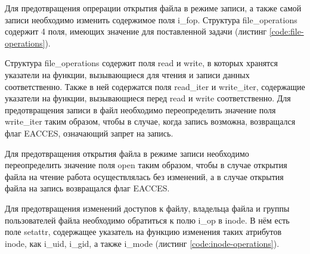 

Для предотвращения опрерации открытия файла в режиме записи, а также самой записи необходимо изменить содержимое поля i\_fop. Структура \linebreak file\_operations содержит 4 поля, имеющих значение для поставленной задачи (листинг \ref{code:file-operations}).


Структура file\_operations содержит поля read и write, в которых хранятся указатели на функции, вызывающиеся для чтения и записи данных соответственно. Также в ней содержатся поля read\_iter и write\_iter, содержащие указатели на функции, вызывающиеся перед read и write соответственно. Для предотвращения записи в файл необходимо переопределить значение поля write\_iter таким образом, чтобы в случае, когда запись возможна, возвращался флаг \linebreak EACCES, означающий запрет на запись.

Для предотвращения открытия файла в режиме записи необходимо переопределить значение поля open таким образом, чтобы в случае открытия файла на чтение работа осуществлялась без изменений, а в случае открытия файла на запись возвращался флаг EACCES.

Для предотвращения изменений доступов к файлу, владельца файла и группы пользователей файла необходимо обратиться к полю i\_op в inode. В нём есть поле setattr, содержащее указатель на функцию изменения таких атрибутов inode, как i\_uid, i\_gid, а также i\_mode (листинг \ref{code:inode-operations}).

